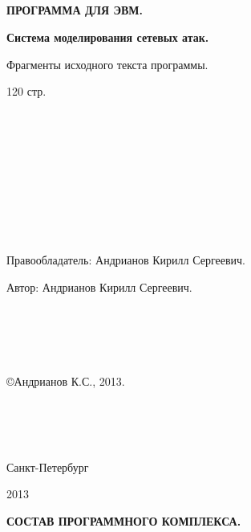 
    \newpage
    \thispagestyle{empty}
    \ \\
    \ \\
    \ \\
    \ \\
    \ \\
    \ \\
    \ \\
    \ \\
    \ \\

    \begin{center}

        \textbf{ПРОГРАММА ДЛЯ ЭВМ.}

        \large\textbf{Система моделирования сетевых атак.}

        Фрагменты исходного текста программы.
        
        120 стр.
    \end{center}

    \ \\
    \ \\
    \ \\
    \ \\
    \ \\
    \ \\
    \ \\
    \ \\
    \ \\



    Правообладатель: Андрианов Кирилл Сергеевич.

    Автор: Андрианов Кирилл Сергеевич.
    \ \\
    \ \\
    \ \\
    \ \\
    \ \\
    \ \\


    \copyright Андрианов К.С., 2013.


    \ \\
    \ \\
    \ \\


    \begin{center}
        Санкт-Петербург

        2013
    \end{center}

\newpage

    \begin{center}
        \large\textbf{ СОСТАВ ПРОГРАММНОГО КОМПЛЕКСА.}
    \end{center}

